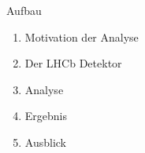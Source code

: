



\maketitle


\begin{frame}[t]{Aufbau}
  \begin{enumerate} \setlength\itemsep{0.5cm}
    \item {\Large Motivation der Analyse}
    \item {\Large Der LHCb Detektor}
    \item {\Large Analyse}
    \item {\Large Ergebnis}
    \item {\Large Ausblick}
  \end{enumerate}
\end{frame}


